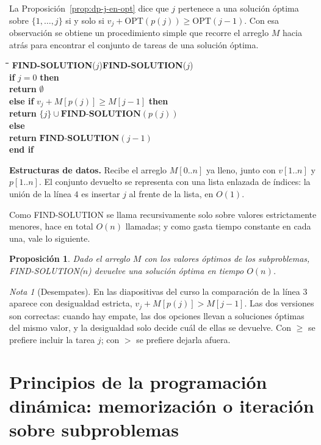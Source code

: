 \documentclass[12pt, spanish, oneside, openany]{book}
\newcommand{\pl}[1]{\makebox[1.6em][r]{\texttt{\footnotesize #1}}\hspace{0.9em}}
\newenvironment{pseudo}[1]{%
  \begin{center}%
  \begin{mdframed}[style=pseudobox]%
  \small
  \begin{tabbing}%
  \hspace{2.5em}\=\hspace{1.5em}\=\hspace{1.5em}\=\hspace{1.5em}\=\hspace{1.5em}\=\kill
  \def\pseudotitulo{#1}\ifx\pseudotitulo\empty\else#1\\[3pt]\fi}%
  {\end{tabbing}\end{mdframed}\end{center}}
\newenvironment{estructuras}%
  {\begin{center}\begin{minipage}{0.93\textwidth}\begin{mdframed}[style=estrbox]%
   \small\textbf{Estructuras de datos.}\;}%
  {\end{mdframed}\end{minipage}\end{center}}
\newcommand{\alg}[1]{#1}
\theoremstyle{uprightplain}
\newtheorem{proposicion}[teorema]{Proposición}
\theoremstyle{definition}
\theoremstyle{remark}
\newtheorem{nota}[teorema]{Nota}
\theoremstyle{definition}
\newcommand{\OPT}{\mathrm{OPT}} %
\begin{document}
La Proposición~\ref{prop:dp-j-en-opt} dice que $j$ pertenece a una solución óptima sobre $\{1,\dots,j\}$ si y solo si $v_j+\OPT(p(j))\ge\OPT(j-1)$. Con esa observación se obtiene un procedimiento simple que recorre el arreglo $M$ hacia atrás para encontrar el conjunto de tareas de una solución óptima.

\begin{pseudo}{\textbf{FIND-SOLUTION}($j$)}
\pl{1}\> \textbf{if} $j = 0$ \textbf{then}\\
\pl{2}\>\> \textbf{return} $\emptyset$\\
\pl{3}\> \textbf{else if} $v_j + M[p(j)] \ge M[j-1]$ \textbf{then}\\
\pl{4}\>\> \textbf{return} $\{j\}\cup\textbf{FIND-SOLUTION}(p(j))$\\
\pl{5}\> \textbf{else}\\
\pl{6}\>\> \textbf{return} $\textbf{FIND-SOLUTION}(j-1)$\\
\pl{7}\> \textbf{end if}
\end{pseudo}

\begin{estructuras}
Recibe el arreglo $M[0..n]$ ya lleno, junto con $v[1..n]$ y $p[1..n]$. El
conjunto devuelto se representa con una lista enlazada de índices: la unión de
la línea $4$ es insertar $j$ al frente de la lista, en $O(1)$.
\end{estructuras}

Como \alg{FIND-SOLUTION} se llama recursivamente solo sobre valores estrictamente menores, hace en total $O(n)$ llamadas; y como gasta tiempo constante en cada una, vale lo siguiente.

\begin{proposicion}
\label{prop:dp-find-solution}
Dado el arreglo $M$ con los valores óptimos de los subproblemas, \alg{FIND-SOLUTION}($n$) devuelve una solución óptima en tiempo $O(n)$.
\end{proposicion}

\begin{nota}[Desempates]
\label{nota:dp-desempates}
En las diapositivas del curso la comparación de la línea $3$ aparece con desigualdad estricta, $v_j+M[p(j)]>M[j-1]$. Las dos versiones son correctas: cuando hay empate, las dos opciones llevan a soluciones óptimas del mismo valor, y la desigualdad solo decide cuál de ellas se devuelve. Con $\ge$ se prefiere incluir la tarea $j$; con $>$ se prefiere dejarla afuera.
\end{nota}


\section{Principios de la programación dinámica: memorización o iteración sobre subproblemas}
\label{sec:dp-principios}
\end{document}
